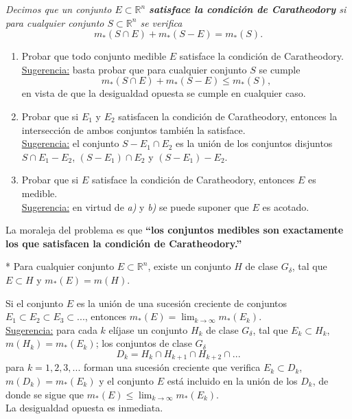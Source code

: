 \documentclass{book}
\newcommand{\rr}{\mathbb{R}}
\newcommand{\di}{\displaystyle}
\begin{document}
  \begin{ejer} {} 
	{\it{Decimos que un conjunto $E\subset \rr^n$ 
  {\bf{satisface la condición de Caratheodory}}
  si para cualquier conjunto $S\subset \rr^n$ se verifica}} 
  $$m_*(S\cap E)+m_*(S-E)=m_*(S). $$
	\begin{enumerate}   
    \item Probar que todo conjunto medible $E$ satisface la condición de Caratheodory.
    \\
    \underline{Sugerencia:} basta probar que para cualquier conjunto $S$ se cumple
    $$m_*(S\cap E)+m_*(S-E)\leq m_*(S), $$
    en vista de que la desigualdad opuesta se cumple en cualquier caso.
 
    \item Probar que si $E_1$ y $E_2$ satisfacen la condición de Caratheodory, 
    entonces la intersección de ambos conjuntos también la satisface.
    \\
    \underline{Sugerencia:} el conjunto $S-E_1\cap E_2$ es la unión de los conjuntos 
    disjuntos $S\cap E_1-E_2$, $(S-E_1)\cap E_2$ y $(S-E_1)-E_2$.

    \item Probar que si $E$ satisface la condición de Caratheodory, entonces $E$ es medible.
    \\
    \underline{Sugerencia:} en virtud de {\it{a)}} y {\it{b)}} se puede suponer que $E$ es acotado.
	\end{enumerate}
    La moraleja del problema es que 
    {\bf{``los conjuntos medibles son exactamente los que satisfacen
    la condición de Caratheodory.''}}
  \end{ejer} 
	
	
  \begin{ejer}{}*
	\label{ej-guia}
  Para cualquier conjunto $E \subset \rr^n$, existe un conjunto $H$ de clase $G_{\delta}$,
  tal que $E \subset H$ y $m_*(E)=m(H)$.
	\end{ejer} 

  \begin{ejer} {}
  Si el conjunto $E$ es la unión de una sucesión creciente de conjuntos 
  $E_1\subset E_2\subset E_3\subset...$, entonces 
  $ m_*(E)=\di\lim_{k\rightarrow \infty} m_*(E_k).$
  \\
  \underline{Sugerencia:} para cada $k$ elíjase un conjunto $H_k$ de clase $G_{\delta}$,
  tal que $E_k\subset H_k$, $m(H_k)=m_*(E_k)$; los conjuntos de clase $G_{\delta}$
  $$D_k=H_k\cap H_{k+1}\cap H_{k+2}\cap... $$
  para $k=1,2,3,...$ forman una sucesión creciente que verifica $E_k \subset D_k$,
  $m(D_k)=m_*(E_k)$ y el conjunto $E$ está incluido en la unión de los $D_k$, de donde
  se sigue que $m_*(E)\leq \di\lim_{k\rightarrow \infty} m_*(E_k)$.
  \\
  La desigualdad opuesta es inmediata.
 \end{ejer}
\end{document}
